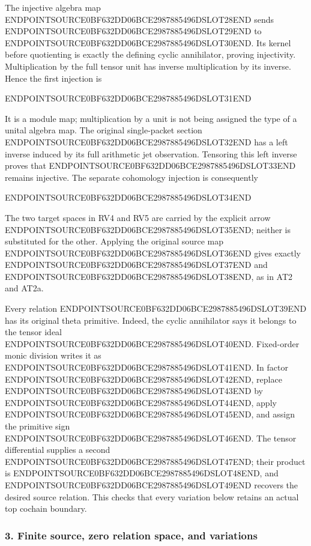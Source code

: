 The injective algebra map ENDPOINTSOURCE0BF632DD06BCE2987885496DSLOT28END sends ENDPOINTSOURCE0BF632DD06BCE2987885496DSLOT29END to ENDPOINTSOURCE0BF632DD06BCE2987885496DSLOT30END. Its kernel before quotienting is exactly the defining cyclic annihilator, proving injectivity. Multiplication by the full tensor unit has inverse multiplication by its inverse. Hence the first injection is

ENDPOINTSOURCE0BF632DD06BCE2987885496DSLOT31END

It is a module map; multiplication by a unit is not being assigned the type of a unital algebra map. The original single-packet section ENDPOINTSOURCE0BF632DD06BCE2987885496DSLOT32END has a left inverse induced by its full arithmetic jet observation. Tensoring this left inverse proves that ENDPOINTSOURCE0BF632DD06BCE2987885496DSLOT33END remains injective. The separate cohomology injection is consequently

ENDPOINTSOURCE0BF632DD06BCE2987885496DSLOT34END

The two target spaces in RV4 and RV5 are carried by the explicit arrow ENDPOINTSOURCE0BF632DD06BCE2987885496DSLOT35END; neither is substituted for the other. Applying the original source map ENDPOINTSOURCE0BF632DD06BCE2987885496DSLOT36END gives exactly ENDPOINTSOURCE0BF632DD06BCE2987885496DSLOT37END and ENDPOINTSOURCE0BF632DD06BCE2987885496DSLOT38END, as in AT2 and AT2a.

Every relation ENDPOINTSOURCE0BF632DD06BCE2987885496DSLOT39END has its original theta primitive. Indeed, the cyclic annihilator says it belongs to the tensor ideal ENDPOINTSOURCE0BF632DD06BCE2987885496DSLOT40END. Fixed-order monic division writes it as ENDPOINTSOURCE0BF632DD06BCE2987885496DSLOT41END. In factor ENDPOINTSOURCE0BF632DD06BCE2987885496DSLOT42END, replace ENDPOINTSOURCE0BF632DD06BCE2987885496DSLOT43END by ENDPOINTSOURCE0BF632DD06BCE2987885496DSLOT44END, apply ENDPOINTSOURCE0BF632DD06BCE2987885496DSLOT45END, and assign the primitive sign ENDPOINTSOURCE0BF632DD06BCE2987885496DSLOT46END. The tensor differential supplies a second ENDPOINTSOURCE0BF632DD06BCE2987885496DSLOT47END; their product is ENDPOINTSOURCE0BF632DD06BCE2987885496DSLOT48END, and ENDPOINTSOURCE0BF632DD06BCE2987885496DSLOT49END recovers the desired source relation. This checks that every variation below retains an actual top cochain boundary.

\subsubsection{3. Finite source, zero relation space, and variations}\label{endpoint-determinant_review--finite-source-zero-relation-space-and-variations}

